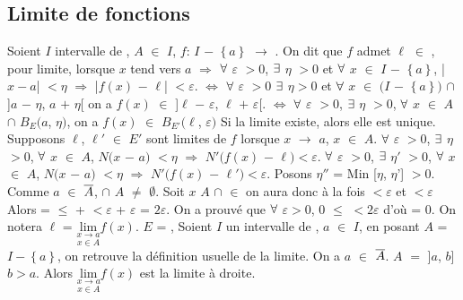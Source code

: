 \documentclass{article}
\begin{document}
\subsection{Limite de fonctions}
\rappel Soient $I$ intervalle de \R, $A$ $\in$ $I$, $f$: $I$ $-$ $\left\{a \right\}$ $\longrightarrow$ \R. On dit que $f$ admet $\ell$ $\in$ \R, pour limite, lorsque \s $x$ tend vers $a$ $\Longrightarrow$ $\forall$ $\varepsilon$ $>0$, $\exists$ $\eta$ $>0$ et $\forall$ $x$ $\in$ $I$ $-$ $\left\{a \right\}$, |$x-a$| $<\eta $ $\Longrightarrow$ |$f(x)$ $-$ $\ell$| $<\varepsilon$.
$\Longleftrightarrow$ $\forall$ $\varepsilon$ $>0$ $\exists$ $\eta >0$ \s et $\forall$ $x$ $\in$ $(I$ $-$ $\left\{a \right\})$ $\cap$ ]$a$ $-$ $\eta$, $a$ $+$ $\eta$[ on a $f(x)$ $\in$ ]$\ell$ $-$ $\varepsilon$, $\ell$ $+$ $\varepsilon$[.
\s
$\Longleftrightarrow$ 
$\forall$ $\varepsilon$ $>0$, $\exists$ $\eta$ $>0$, $\forall$ $x$ $\in$ $A$ $\cap$ $B_E(a$, $\eta)$, on a $f(x)$ $\in$ $B_{E'}(\ell$, $\varepsilon)$
\remarque Si la limite existe, alors elle est unique.
\demo Supposons $\ell$, $\ell'$ $\in$ $E'$ sont limites de $f$ lorsque $x$ $\longrightarrow$ $a$, $x$ $\in$ $A$. \s
$\forall$ $\varepsilon$ $>0$, $\exists$ $\eta$ $>0$, $\forall$ $x$ $\in$ $A$, $N(x$ $-$ $a)$ $<\eta$ $\Longrightarrow$ $N'(f(x)$ $-$ $\ell)<\varepsilon$. \s
$\forall$ $\varepsilon$ $>0$, $\exists$ $\eta'$ $>0$, $\forall$ $x$ $\in$ $A$, $N(x$ $-$ $a)$ $<\eta$ $\Longrightarrow$ $N'(f(x)$ $-$ $\ell')<\varepsilon$. \s
Posons $\eta''$ = Min [$\eta$, $\eta’$] $>0$. Comme $a$ $\in$ $\overline{A}$,  $\cap$ $A$ $\neq$ $\emptyset$. Soit $x$ $A$ $\cap$ $\in$  on aura donc à la \s fois  $<\varepsilon$ et  $<\varepsilon$ \s
Alors  =  $\leqslant$  +  $< \varepsilon$ + $\varepsilon$ = $2\varepsilon$. On a \s prouvé que $\forall$ $\varepsilon >0$, $0$ $\leqslant$  $<2\varepsilon$ d'où  = 0. On notera $\ell$ = $\underset{x \in A}{\underset{x \rightarrow a}{\text{lim}}}f(x)$. \s
\ex $E$ = \R, Soient $I$ un intervalle de \R, $a$ $\in$ $I$, en posant $A$ = $I-\left\{ a \right\}$, on retrouve la définition usuelle de la \s limite. On a $a$ $\in$ $\overline{A}$. $A$ $=$  ]$a$, $b$] $b>a$. Alors $\underset{x \in A}{\underset{x \rightarrow a}{\text{lim}}}f(x)$ est la limite à droite.
\end{document}
